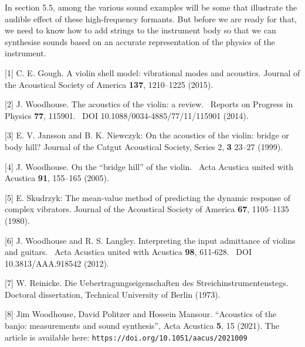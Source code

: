 


  In section 5.5, among the various sound examples will be some that illustrate 
  the audible effect of these high-frequency formants. But before we are ready 
  for that, we need to know how to add strings to the instrument body so that 
  we can synthesise sounds based on an accurate representation of the physics 
  of the instrument. 



  \sectionreferences{}[1] C. E. Gough. A violin shell model: vibrational modes 
  and acoustics. Journal of the Acoustical Society of America \textbf{137}, 
  1210–1225 (2015). 

  [2] J. Woodhouse. The acoustics of the violin: a review.~ Reports on Progress 
  in Physics \textbf{77}, 115901.~ DOI 10.1088/0034-4885/77/11/115901 (2014). 

  [3] E. V. Jansson and B. K. Niewczyk: On the acoustics of the violin: bridge 
  or body hill? Journal of the Catgut Acoustical Society, Series 2, \textbf{3 } 
  23–27 (1999). 

  [4] J. Woodhouse. On the ``bridge hill'' of the violin.~ Acta Acustica united 
  with Acustica \textbf{91}, 155–165 (2005). 

  [5] E. Skudrzyk: The mean-value method of predicting the dynamic response of 
  complex vibrators. Journal of the Acoustical Society of America \textbf{67}, 
  1105–1135 (1980). 

  [6] J. Woodhouse and R. S. Langley. Interpreting the input admittance of 
  violins and guitars.~ Acta Acustica united with Acustica \textbf{98}, 
  611-628.~ DOI 10.3813/AAA.918542 (2012). 

  [7] W. Reinicke. Die Uebertragungseigenschaften des Streichinstrumentenstegs. 
  Doctoral dissertation, Technical University of Berlin (1973). 

  [8] Jim Woodhouse, David Politzer and Hossein Mansour. ``Acoustics of the 
  banjo: measurements and sound synthesis'', Acta Acustica \textbf{5}, 15 
  (2021). The article is available here: 
  \tt{}https://doi.org/10.1051/aacus/2021009\rm{} 